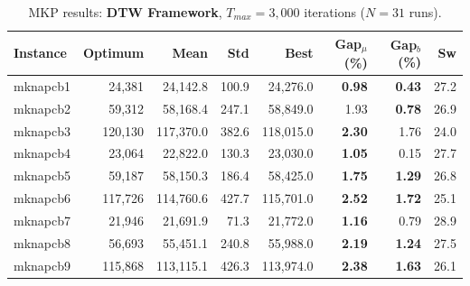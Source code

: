 \documentclass[review]{elsarticle}
\begin{document}
\begin{table}[htbp]
\centering
\caption{MKP results: \textbf{DTW Framework}, $T_{max} = 3{,}000$ iterations ($N=31$ runs).}
\label{tab:mkp_dtw_3k}
\begin{tabular}{lrrrrrrr}
\toprule
\textbf{Instance} & \textbf{Optimum} & \textbf{Mean} & \textbf{Std} & \textbf{Best} & \textbf{Gap$_\mu$ (\%)} & \textbf{Gap$_b$ (\%)} & \textbf{Sw} \\
\midrule
mknapcb1 & 24,381 & 24,142.8 & 100.9 & 24,276.0 & \textbf{0.98} & \textbf{0.43} & 27.2 \\
mknapcb2 & 59,312 & 58,168.4 & 247.1 & 58,849.0 & 1.93 & \textbf{0.78} & 26.9 \\
mknapcb3 & 120,130 & 117,370.0 & 382.6 & 118,015.0 & \textbf{2.30} & 1.76 & 24.0 \\
mknapcb4 & 23,064 & 22,822.0 & 130.3 & 23,030.0 & \textbf{1.05} & 0.15 & 27.7 \\
mknapcb5 & 59,187 & 58,150.3 & 186.4 & 58,425.0 & \textbf{1.75} & \textbf{1.29} & 26.8 \\
mknapcb6 & 117,726 & 114,760.6 & 427.7 & 115,701.0 & \textbf{2.52} & \textbf{1.72} & 25.1 \\
mknapcb7 & 21,946 & 21,691.9 & 71.3 & 21,772.0 & \textbf{1.16} & 0.79 & 28.9 \\
mknapcb8 & 56,693 & 55,451.1 & 240.8 & 55,988.0 & \textbf{2.19} & \textbf{1.24} & 27.5 \\
mknapcb9 & 115,868 & 113,115.1 & 426.3 & 113,974.0 & \textbf{2.38} & \textbf{1.63} & 26.1 \\
\bottomrule
\end{tabular}
\end{table}
\end{document}

